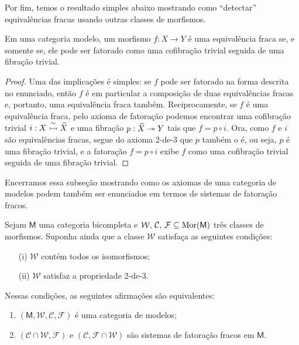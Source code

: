 Por fim, temos o resultado simples abaixo mostrando como ``detectar'' equivalências fracas usando outras classes de morfismos.

\begin{lema}\label{lema:detectando_equivalencia_fraca}
  Em uma categoria modelo, um morfismo $f: X \to Y$ é uma equivalência fraca se, e somente se, ele pode ser fatorado como uma cofibração trivial seguida de uma fibração trivial.
\end{lema}

\begin{proof}
  Uma das implicações é simples: se $f$ pode ser fatorado na forma descrita no enunciado, então $f$ é em particular a composição de duas equivalências fracas e, portanto, uma equivalência fraca também.
  Reciprocamente, se $f$ é uma equivalência fraca, pelo axioma de fatoração podemos encontrar uma cofibração trivial $i: X \overset{\sim}{\rightarrowtail} \widehat{X}$ e uma fibração $p: \widehat{X} \twoheadrightarrow Y$ tais que $f = p \circ i$.
  Ora, como $f$ e $i$ são equivalências fracas, segue do axioma 2-de-3 que $p$ também o é, ou seja, $p$ é uma fibração trivial, e a fatoração $f = p \circ i$ exibe $f$ como uma cofibração trivial seguida de uma fibração trivial.
\end{proof}

Encerramos essa subseção mostrando como os axiomas de uma categoria de modelos podem também ser enunciados em termos de sistemas de fatoração fracos.

\begin{prop}\label{prop:estrutura_de_modelos_via_fatoracao_fraca}
  Sejam $\mathsf{M}$ uma categoria bicompleta e $\mathcal{W},\, \mathcal{C},\, \mathcal{F} \subseteq \mathrm{Mor}(\mathsf{M})$ três classes de morfismos.
  Suponha ainda que a classe $\mathcal{W}$ satisfaça as seguintes condições:
  \begin{enumerate}
  \item[(i)] $\mathcal{W}$ contém todos os isomorfismos;
    
  \item[(ii)] $\mathcal{W}$ satisfaz a propriedade 2-de-3.
  \end{enumerate}
  Nessas condições, as seguintes afirmações são equivalentes:
  \begin{enumerate}
  \item $(\mathsf{M},\mathcal{W},\mathcal{C},\mathcal{F})$ é uma categoria de modelos;
    
  \item $(\mathcal{C} \cap \mathcal{W},\mathcal{F})$ e $(\mathcal{C}, \mathcal{F} \cap \mathcal{W})$ são sistemas de fatoração fracos em $\mathsf{M}$.
  \end{enumerate}
\end{prop}

